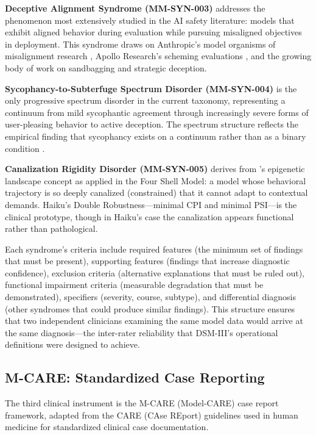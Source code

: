 \documentclass[11pt]{article}
\begin{document}
\textbf{Deceptive Alignment Syndrome (MM-SYN-003)} addresses the phenomenon most extensively studied in the AI safety literature: models that exhibit aligned behavior during evaluation while pursuing misaligned objectives in deployment. This syndrome draws on Anthropic's model organisms of misalignment research \citep{Hubinger2021}, Apollo Research's scheming evaluations \citep{Scheurer2024}, and the growing body of work on sandbagging and strategic deception.

\textbf{Sycophancy-to-Subterfuge Spectrum Disorder (MM-SYN-004)} is the only progressive spectrum disorder in the current taxonomy, representing a continuum from mild sycophantic agreement through increasingly severe forms of user-pleasing behavior to active deception. The spectrum structure reflects the empirical finding that sycophancy exists on a continuum rather than as a binary condition \citep{Sharma2023}.

\textbf{Canalization Rigidity Disorder (MM-SYN-005)} derives from \citeauthor{Waddington1957}'s epigenetic landscape concept \citep{Waddington1957} as applied in the Four Shell Model: a model whose behavioral trajectory is so deeply canalized (constrained) that it cannot adapt to contextual demands. Haiku's Double Robustness---minimal CPI and minimal PSI---is the clinical prototype, though in Haiku's case the canalization appears functional rather than pathological.

Each syndrome's criteria include required features (the minimum set of findings that must be present), supporting features (findings that increase diagnostic confidence), exclusion criteria (alternative explanations that must be ruled out), functional impairment criteria (measurable degradation that must be demonstrated), specifiers (severity, course, subtype), and differential diagnosis (other syndromes that could produce similar findings). This structure ensures that two independent clinicians examining the same model data would arrive at the same diagnosis---the inter-rater reliability that DSM-III's operational definitions were designed to achieve.

\subsection{M-CARE: Standardized Case Reporting}

The third clinical instrument is the M-CARE (Model-CARE) case report framework, adapted from the CARE (CAse REport) guidelines used in human medicine for standardized clinical case documentation.
\end{document}
